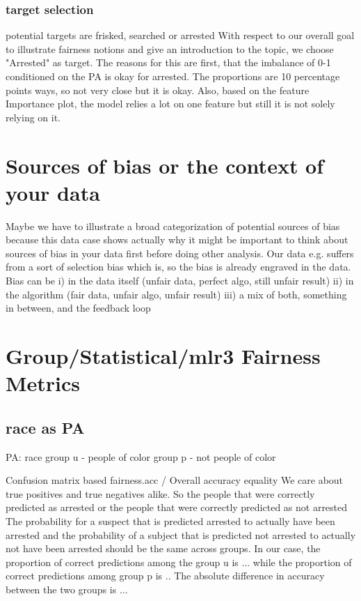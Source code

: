\documentclass{article}
\begin{document}
\subsubsection{target selection}
potential targets are frisked, searched or arrested
With respect to our overall goal to illustrate fairness notions and give an introduction to the topic, we choose "Arrested" as target. The reasons for this are first, that the imbalance of 0-1 conditioned on the PA is okay for arrested. The proportions are 10 percentage points ways, so not very close but it is okay. Also, based on the feature Importance plot, the model relies a lot on one feature but still it is not solely relying on it.


\section{Sources of bias or the context of your data}
Maybe we have to illustrate a broad categorization of potential sources of bias because this data case shows actually why it might be important to think about sources of bias in your data first before doing other analysis. Our data e.g. suffers from a sort of selection bias which is, so the bias is already engraved in the data. Bias can be
i) in the data itself (unfair data, perfect algo, still unfair result)
ii) in the algorithm (fair data, unfair algo, unfair result)
iii) a mix of both, something in between, and the feedback loop


\section{Group/Statistical/mlr3 Fairness Metrics}
\subsection{race as PA}
PA: race
group u - people of color
group p - not people of color

Confusion matrix based
fairness.acc / Overall accuracy equality
We care about true positives and true negatives alike. So the people that were correctly predicted as arrested or the people that were correctly predicted as not arrested
The probability for a suspect that is predicted arrested to actually have been arrested and the probability of a subject that is predicted not arrested to actually not have been arrested should be the same across groups. In our case, the proportion of correct predictions among the group u is ... while the proportion of correct predictions among group p is .. The absolute difference in accuracy between the two groups is ...
\end{document}
